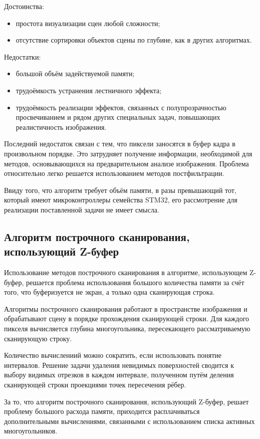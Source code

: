 Достоинства:
\begin{itemize}
	\item простота визуализации сцен любой сложности;
	\item отсутствие сортировки объектов сцены по глубине, как в других алгоритмах.
\end{itemize}

Недостатки:
\begin{itemize}
	\item большой объём задействуемой памяти;
	\item трудоёмкость устранения лестничного эффекта;
	\item трудоёмкость реализации эффектов, связанных с полупрозрачностью просвечиванием и рядом других специальных задач, повышающих реалистичность изображения.
\end{itemize}

Последний недостаток связан с тем, что пиксели заносятся в буфер кадра в произвольном порядке. Это затрудняет получение информации, необходимой для методов, основывающихся на предварительном анализе изображения. Проблема относительно легко решается использованием методов постфильтрации.

Ввиду того, что алгоритм требует объём памяти, в разы превышающий тот, который имеют микроконтроллеры семейства STM32, его рассмотрение для реализации поставленной задачи не имеет смысла.

\subsection{Алгоритм построчного сканирования, использующий Z-буфер}
Использование методов построчного сканирования в алгоритме, использующем Z-буфер, решается проблема использования большого количества памяти за счёт того, что буферизуется не экран, а только одна сканирующая строка.

Алгоритмы построчного сканирования работают в пространстве изображения и обрабатывают сцену в порядке прохождения сканирующей строки. Для каждого пикселя вычисляется глубина многоугольника, пересекающего рассматриваемую сканирующую строку. 

Количество вычислениий можно сократить, если использовать понятие интервалов. Решение задачи удаления невидимых поверхностей сводится к выбору видимых отрезков в каждом интервале, полученном путём деления сканирующей строки проекциями точек пересечения рёбер.

За то, что алгоритм построчного сканирования, использующий Z-буфер, решает проблему большого расхода памяти, приходится расплачиваться дополнительными вычислениями, связанными с использованием списка активных многоугольников.

